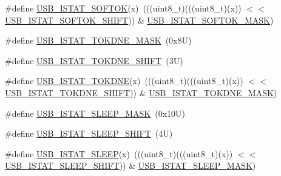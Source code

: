 \begin{DoxyCompactItemize}
\item 
\#define \mbox{\hyperlink{group___u_s_b___register___masks_ga3dec5ce053bffc80185a8b784eb76dcc}{U\+S\+B\+\_\+\+I\+S\+T\+A\+T\+\_\+\+S\+O\+F\+T\+OK}}(x)~(((uint8\+\_\+t)(((uint8\+\_\+t)(x)) $<$$<$ \mbox{\hyperlink{group___u_s_b___register___masks_gae58407103a8cebfc9c4a8e8c7f08fddb}{U\+S\+B\+\_\+\+I\+S\+T\+A\+T\+\_\+\+S\+O\+F\+T\+O\+K\+\_\+\+S\+H\+I\+FT}})) \& \mbox{\hyperlink{group___u_s_b___register___masks_gab45774502290aab38038a19110e8558b}{U\+S\+B\+\_\+\+I\+S\+T\+A\+T\+\_\+\+S\+O\+F\+T\+O\+K\+\_\+\+M\+A\+SK}})
\item 
\#define \mbox{\hyperlink{group___u_s_b___register___masks_ga12db7650592f7e48ae702b71d1728c98}{U\+S\+B\+\_\+\+I\+S\+T\+A\+T\+\_\+\+T\+O\+K\+D\+N\+E\+\_\+\+M\+A\+SK}}~(0x8\+U)
\item 
\#define \mbox{\hyperlink{group___u_s_b___register___masks_ga55bb01da118027c84423bfcb317eabb5}{U\+S\+B\+\_\+\+I\+S\+T\+A\+T\+\_\+\+T\+O\+K\+D\+N\+E\+\_\+\+S\+H\+I\+FT}}~(3\+U)
\item 
\#define \mbox{\hyperlink{group___u_s_b___register___masks_ga6aa4ea95ad3c62b922ad95fe1edcb4b8}{U\+S\+B\+\_\+\+I\+S\+T\+A\+T\+\_\+\+T\+O\+K\+D\+NE}}(x)~(((uint8\+\_\+t)(((uint8\+\_\+t)(x)) $<$$<$ \mbox{\hyperlink{group___u_s_b___register___masks_ga55bb01da118027c84423bfcb317eabb5}{U\+S\+B\+\_\+\+I\+S\+T\+A\+T\+\_\+\+T\+O\+K\+D\+N\+E\+\_\+\+S\+H\+I\+FT}})) \& \mbox{\hyperlink{group___u_s_b___register___masks_ga12db7650592f7e48ae702b71d1728c98}{U\+S\+B\+\_\+\+I\+S\+T\+A\+T\+\_\+\+T\+O\+K\+D\+N\+E\+\_\+\+M\+A\+SK}})
\item 
\#define \mbox{\hyperlink{group___u_s_b___register___masks_ga008ba082c8646490852ad753ebcf4e62}{U\+S\+B\+\_\+\+I\+S\+T\+A\+T\+\_\+\+S\+L\+E\+E\+P\+\_\+\+M\+A\+SK}}~(0x10\+U)
\item 
\#define \mbox{\hyperlink{group___u_s_b___register___masks_ga724873614965bae7c2d6c45aa4731f70}{U\+S\+B\+\_\+\+I\+S\+T\+A\+T\+\_\+\+S\+L\+E\+E\+P\+\_\+\+S\+H\+I\+FT}}~(4\+U)
\item 
\#define \mbox{\hyperlink{group___u_s_b___register___masks_gaf85aae24718a5e6e24e6ac081f03ea89}{U\+S\+B\+\_\+\+I\+S\+T\+A\+T\+\_\+\+S\+L\+E\+EP}}(x)~(((uint8\+\_\+t)(((uint8\+\_\+t)(x)) $<$$<$ \mbox{\hyperlink{group___u_s_b___register___masks_ga724873614965bae7c2d6c45aa4731f70}{U\+S\+B\+\_\+\+I\+S\+T\+A\+T\+\_\+\+S\+L\+E\+E\+P\+\_\+\+S\+H\+I\+FT}})) \& \mbox{\hyperlink{group___u_s_b___register___masks_ga008ba082c8646490852ad753ebcf4e62}{U\+S\+B\+\_\+\+I\+S\+T\+A\+T\+\_\+\+S\+L\+E\+E\+P\+\_\+\+M\+A\+SK}})
\item 
$$
\end{DoxyCompactItemize}
